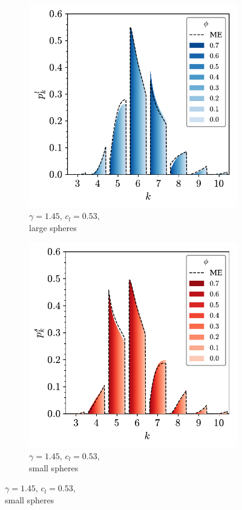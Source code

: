 \begin{figure}[bt]
     \centering
     
      \begin{subfigure}[b]{0.48\textwidth}
         \centering
         \includegraphics[width=\textwidth]{./figures/quasi2d/phi_me_l_53.pdf}
         \caption{$\gamma=1.45$, $c_l=0.53$, \\large spheres}
         \label{fig:bime1}
     \end{subfigure}
     \hfill
      \begin{subfigure}[b]{0.48\textwidth}
         \centering
         \includegraphics[width=\textwidth]{./figures/quasi2d/phi_me_s_53.pdf}
         \caption{$\gamma=1.45$, $c_l=0.53$, \\small spheres}
         \label{fig:bime2}
     \end{subfigure}
     \hfill
     

\end{figure}
